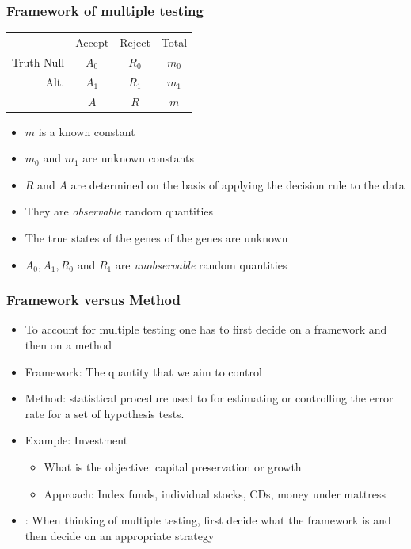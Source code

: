 \documentclass[xcolor=x11names,compress]{beamer}\usepackage[]{graphicx}\usepackage[]{color}
\begin{document}
\begin{frame}
   \frametitle{Framework of multiple testing}
  \begin{center}
  \begin{tabular}{r|c|c|c}
    & Accept & Reject & Total \\
   \cline{1-4}
  Truth Null  & $A_0$ & $R_0$ & $m_0$ \\
  \cline{1-4}
    Alt. & $A_1$ & $R_1$ & $m_1$ \\
  \cline{1-4} 
    & $A$ & $R$ & $m$
  \end{tabular}
  \end{center}
 
  \begin{itemize}
    \item $m$ is a known constant 
    \item $m_0$ and $m_1$ are unknown constants
    \item $R$ and $A$ are determined on the basis of applying the decision rule to the data
    \item They are {\it observable} random quantities
    \item The true states of the genes of the genes are unknown
    \item $A_0,A_1,R_0$ and $R_1$ are  {\it unobservable} random quantities
    \end{itemize}
\end{frame}

\begin{frame}
  \frametitle{Framework versus Method}
  \begin{itemize}
    \item To account for multiple testing one has to first decide on a framework and then
          on a method
    \item {\Large Framework:} The quantity that we aim to control
    \item {\Large Method:} statistical procedure used to for estimating or controlling the error 
      rate for a set of hypothesis tests.
    \item Example: Investment 
      \begin{itemize}
      \item What is the objective: capital preservation or growth
      \item Approach: Index funds, individual stocks, CDs, money under mattress
      \end{itemize}
   \item: When thinking of multiple testing, first decide what the framework is and then
          decide on an appropriate strategy
  \end{itemize}
\end{frame}
\end{document}
